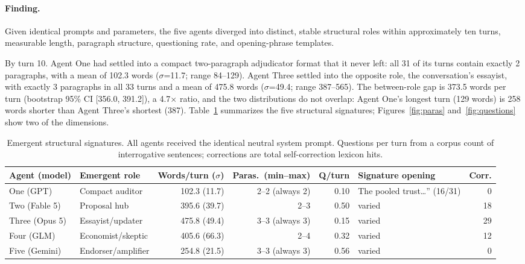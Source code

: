 \documentclass[sigconf,nonacm=true]{acmart}
\begin{document}
\paragraph{Finding.} Given identical prompts and parameters, the five agents diverged into distinct, stable structural roles within approximately ten turns, measurable length, paragraph structure, questioning rate, and opening-phrase templates.

By turn 10. Agent One had settled into a compact two-paragraph adjudicator format that it never left: all 31 of its turns contain exactly 2 paragraphs, with a mean of 102.3 words ($\sigma$=11.7; range 84--129). Agent Three settled into the opposite role, the conversation's essayist, with exactly 3 paragraphs in all 33 turns and a mean of 475.8 words ($\sigma$=49.4; range 387--565). The between-role gap is 373.5 words per turn (bootstrap 95\% CI [356.0, 391.2]), a 4.7$\times$ ratio, and the two distributions do not overlap: Agent One's longest turn (129 words) is 258 words shorter than Agent Three's shortest (387). Table~\ref{tab:signatures} summarizes the five structural signatures; Figures~\ref{fig:paras} and~\ref{fig:questions} show two of the dimensions.

\begin{table}[t]
\caption{Emergent structural signatures. All agents received the identical neutral system prompt. Questions per turn from a corpus count of interrogative sentences; corrections are total self-correction lexicon hits.}
\label{tab:signatures}
\begin{tabular}{llrrrlr}
\toprule
Agent (model) & Emergent role & Words/turn ($\sigma$) & Paras.\ (min--max) & Q/turn & Signature opening & Corr. \\
\midrule
One (GPT) & Compact auditor & 102.3 (11.7) & 2--2 (always 2) & 0.10 & The pooled trust\ldots'' (16/31) & 0 \\
Two (Fable 5) & Proposal hub & 395.6 (39.7) & 2--3 & 0.50 & varied & 18 \\
Three (Opus 5) & Essayist/updater & 475.8 (49.4) & 3--3 (always 3) & 0.15 & varied & 29 \\
Four (GLM) & Economist/skeptic & 405.6 (66.3) & 2--4 & 0.32 & varied & 12 \\
Five (Gemini) & Endorser/amplifier & 254.8 (21.5) & 3--3 (always 3) & 0.56 & varied & 0 \\
\bottomrule
\end{tabular}
\end{table}
\end{document}
